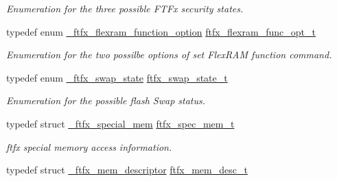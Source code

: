 \begin{DoxyCompactItemize}
\begin{DoxyCompactList}\small\item\em Enumeration for the three possible F\+T\+Fx security states. \end{DoxyCompactList}\item 
\mbox{\label{group__ftfx__controller_ga953cf8f316acac60d44384e338b790d7}} 
typedef enum \mbox{\hyperlink{group__ftfx__controller_ga800c3413ac2380e1d63505c39eeec9b8}{\+\_\+ftfx\+\_\+flexram\+\_\+function\+\_\+option}} \mbox{\hyperlink{group__ftfx__controller_ga953cf8f316acac60d44384e338b790d7}{ftfx\+\_\+flexram\+\_\+func\+\_\+opt\+\_\+t}}
\begin{DoxyCompactList}\small\item\em Enumeration for the two possilbe options of set Flex\+R\+AM function command. \end{DoxyCompactList}\item 
\mbox{\label{group__ftfx__controller_gad668a89052994dc917b1738f4e96fa72}} 
typedef enum \mbox{\hyperlink{group__ftfx__controller_gac6715381632a07d502632b03f8cfb402}{\+\_\+ftfx\+\_\+swap\+\_\+state}} \mbox{\hyperlink{group__ftfx__controller_gad668a89052994dc917b1738f4e96fa72}{ftfx\+\_\+swap\+\_\+state\+\_\+t}}
\begin{DoxyCompactList}\small\item\em Enumeration for the possible flash Swap status. \end{DoxyCompactList}\item 
\mbox{\label{group__ftfx__controller_ga6a3bd19cb0ff32d44e464562765a8127}} 
typedef struct \mbox{\hyperlink{struct__ftfx__special__mem}{\+\_\+ftfx\+\_\+special\+\_\+mem}} \mbox{\hyperlink{group__ftfx__controller_ga6a3bd19cb0ff32d44e464562765a8127}{ftfx\+\_\+spec\+\_\+mem\+\_\+t}}
\begin{DoxyCompactList}\small\item\em ftfx special memory access information. \end{DoxyCompactList}\item 
\mbox{\label{group__ftfx__controller_ga64a01792d0090fb0202473c138e0c2c9}} 
typedef struct \mbox{\hyperlink{struct__ftfx__mem__descriptor}{\+\_\+ftfx\+\_\+mem\+\_\+descriptor}} \mbox{\hyperlink{group__ftfx__controller_ga64a01792d0090fb0202473c138e0c2c9}{ftfx\+\_\+mem\+\_\+desc\+\_\+t}}

\end{DoxyCompactItemize}

